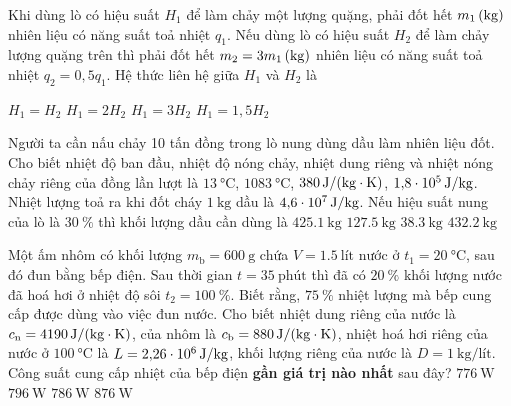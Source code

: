 \begin{ex}
	Khi dùng lò có hiệu suất $H_1$ để làm chảy một lượng quặng, phải đốt hết $\xsi{m_1}{\left(\kilogram\right)}$ nhiên liệu có năng suất toả nhiệt $q_1$. Nếu dùng lò có hiệu suất $H_2$ để làm chảy lượng quặng trên thì phải đốt hết $m_2=\xsi{3m_1}{\left(\kilogram\right)}$ nhiên liệu có năng suất toả nhiệt $q_2=0,5q_1$. Hệ thức liên hệ giữa $H_1$ và $H_2$ là
	
	\choice
	{$H_1=H_2$}
	{$H_1=2H_2$}
	{$H_1=3H_2$}
	{\True $H_1=1,5H_2$}
\end{ex}
\begin{ex}
	Người ta cần nấu chảy 10 tấn đồng trong lò nung dùng dầu làm nhiên liệu đốt. Cho biết nhiệt độ ban đầu, nhiệt độ nóng chảy, nhiệt dung riêng và nhiệt nóng chảy riêng của đồng lần lượt là $\SI{13}{\celsius}$, $\SI{1083}{\celsius}$, $\SI{380}{\joule/\left(\kilogram\cdot\kelvin\right)}$, $\SI{1.8E5}{\joule/\kilogram}$. Nhiệt lượng toả ra khi đốt cháy $\SI{1}{\kilogram}$ dầu là $\SI{4.6E7}{\joule/\kilogram}$. Nếu hiệu suất nung của lò là $\SI{30}{\percent}$ thì khối lượng dầu cần dùng là
	\choice
	{\True $\SI{425.1}{\kilogram}$}
	{$\SI{127.5}{\kilogram}$}
	{$\SI{38.3}{\kilogram}$}
	{$\SI{432.2}{\kilogram}$}
\end{ex}
\begin{ex}
	Một ấm nhôm có khối lượng $m_\text{b}=\SI{600}{\gram}$ chứa $V=\SI{1.5}{\text{lít}}$ nước ở $t_1=\SI{20}{\celsius}$, sau đó đun bằng bếp điện. Sau thời gian $t=\SI{35}{\text{phút}}$ thì đã có $\SI{20}{\percent}$ khối lượng nước đã hoá hơi ở nhiệt độ sôi $t_2=\SI{100}{\percent}$. Biết rằng, $\SI{75}{\percent}$ nhiệt lượng mà bếp cung cấp được dùng vào việc đun nước. Cho biết nhiệt dung riêng của nước là $c_\text{n}=\SI{4190}{\joule/\left(\kilogram\cdot\kelvin\right)}$, của nhôm là $c_\text{b}=\SI{880}{\joule/\left(\kilogram\cdot\kelvin\right)}$, nhiệt hoá hơi riêng của nước ở $\SI{100}{\celsius}$ là $L=\SI{2.26E6}{\joule/\kilogram}$, khối lượng riêng của nước là $D=\SI{1}{\kilogram/\text{lít}}$. Công suất cung cấp nhiệt của bếp điện \textbf{gần giá trị nào nhất} sau đây?	
	\choice
	{\True $\SI{776}{\watt}$}
	{$\SI{796}{\watt}$}
	{$\SI{786}{\watt}$}
	{$\SI{876}{\watt}$}
\end{ex}
